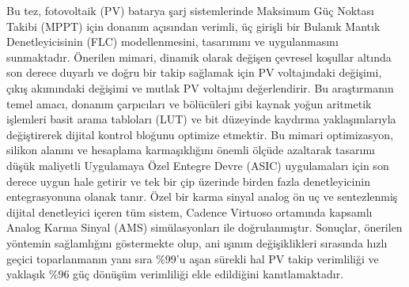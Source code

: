 \documentclass[a4paper,oneside,12pt]{report}
\numberwithin{equation}{chapter}
\begin{document}
\begin{ozet}
Bu tez, fotovoltaik (PV) batarya şarj sistemlerinde Maksimum Güç Noktası Takibi (MPPT) için donanım açısından verimli, üç girişli bir Bulanık Mantık Denetleyicisinin (FLC) modellenmesini, tasarımını ve uygulanmasını sunmaktadır. Önerilen mimari, dinamik olarak değişen çevresel koşullar altında son derece duyarlı ve doğru bir takip sağlamak için PV voltajındaki değişimi, çıkış akımındaki değişimi ve mutlak PV voltajını değerlendirir. Bu araştırmanın temel amacı, donanım çarpıcıları ve bölücüleri gibi kaynak yoğun aritmetik işlemleri basit arama tabloları (LUT) ve bit düzeyinde kaydırma yaklaşımlarıyla değiştirerek dijital kontrol bloğunu optimize etmektir. Bu mimari optimizasyon, silikon alanını ve hesaplama karmaşıklığını önemli ölçüde azaltarak tasarımı düşük maliyetli Uygulamaya Özel Entegre Devre (ASIC) uygulamaları için son derece uygun hale getirir ve tek bir çip üzerinde birden fazla denetleyicinin entegrasyonuna olanak tanır. Özel bir karma sinyal analog ön uç ve sentezlenmiş dijital denetleyici içeren tüm sistem, Cadence Virtuoso ortamında kapsamlı Analog Karma Sinyal (AMS) simülasyonları ile doğrulanmıştır. Sonuçlar, önerilen yöntemin sağlamlığını göstermekte olup, ani ışınım değişiklikleri sırasında hızlı geçici toparlanmanın yanı sıra \%99'u aşan sürekli hal PV takip verimliliği ve yaklaşık \%96 güç dönüşüm verimliliği elde edildiğini kanıtlamaktadır.
\end{ozet}

\tableofcontents
\listoffigures
\listoftables

\begin{symbols}
\sym{}{}
\sym{ }{}
\end{symbols}
\end{document}
